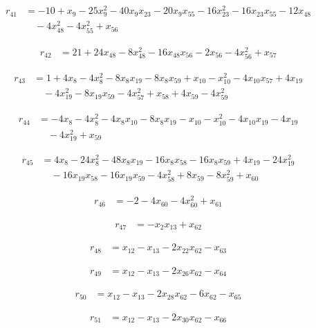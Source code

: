 \begin{align*}
r_{41}&=-10+x_{9}-25x_{9}^{2}-40x_{9}x_{23}-20x_{9}x_{55}-16x_{23}^{2}-16x_{23}x_{55}-12x_{48}\\
&\quad -4x_{48}^{2}-4x_{55}^{2}+x_{56}
\end{align*}

\begin{align*}
r_{42}&=21+24x_{48}-8x_{48}^{2}-16x_{48}x_{56}-2x_{56}-4x_{56}^{2}+x_{57}
\end{align*}

\begin{align*}
r_{43}&=1+4x_{8}-4x_{8}^{2}-8x_{8}x_{19}-8x_{8}x_{59}+x_{10}-x_{10}^{2}-4x_{10}x_{57}+4x_{19}\\
&\quad -4x_{19}^{2}-8x_{19}x_{59}-4x_{57}^{2}+x_{58}+4x_{59}-4x_{59}^{2}
\end{align*}

\begin{align*}
r_{44}&=-4x_{8}-4x_{8}^{2}-4x_{8}x_{10}-8x_{8}x_{19}-x_{10}-x_{10}^{2}-4x_{10}x_{19}-4x_{19}\\
&\quad -4x_{19}^{2}+x_{59}
\end{align*}

\begin{align*}
r_{45}&=4x_{8}-24x_{8}^{2}-48x_{8}x_{19}-16x_{8}x_{58}-16x_{8}x_{59}+4x_{19}-24x_{19}^{2}\\
&\quad -16x_{19}x_{58}-16x_{19}x_{59}-4x_{58}^{2}+8x_{59}-8x_{59}^{2}+x_{60}
\end{align*}

\begin{align*}
r_{46}&=-2-4x_{60}-4x_{60}^{2}+x_{61}
\end{align*}

\begin{align*}
r_{47}&=-x_{2}x_{13}+x_{62}
\end{align*}

\begin{align*}
r_{48}&=x_{12}-x_{13}-2x_{22}x_{62}-x_{63}
\end{align*}

\begin{align*}
r_{49}&=x_{12}-x_{13}-2x_{26}x_{62}-x_{64}
\end{align*}

\begin{align*}
r_{50}&=x_{12}-x_{13}-2x_{28}x_{62}-6x_{62}-x_{65}
\end{align*}

\begin{align*}
r_{51}&=x_{12}-x_{13}-2x_{30}x_{62}-x_{66}
\end{align*}

